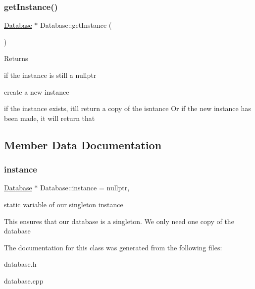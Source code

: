 \subsubsection{\texorpdfstring{get\+Instance()}{getInstance()}}
{\footnotesize\ttfamily \hyperlink{class_database}{Database} $\ast$ Database\+::get\+Instance (\begin{DoxyParamCaption}{ }\end{DoxyParamCaption})\hspace{0.3cm}{\ttfamily [static]}}


\begin{DoxyItemize}
\item \begin{DoxyReturn}{Returns}

\end{DoxyReturn}

\end{DoxyItemize}if the instance is still a nullptr

create a new instance

if the instance exists, it\textquotesingle{}ll return a copy of the isntance Or if the new instance has been made, it will return that 

\subsection{Member Data Documentation}
\mbox{\label{class_database_a5926460fe1c15c95d470fcde637f8d22}} 
\subsubsection{\texorpdfstring{instance}{instance}}
{\footnotesize\ttfamily \hyperlink{class_database}{Database} $\ast$ Database\+::instance = nullptr\hspace{0.3cm}{\ttfamily [static]}, {\ttfamily [private]}}

static variable of our singleton instance

This ensures that our database is a singleton. We only need one copy of the database 

The documentation for this class was generated from the following files\+:\begin{DoxyCompactItemize}
\item 
database.\+h\item 
database.\+cpp\end{DoxyCompactItemize}
